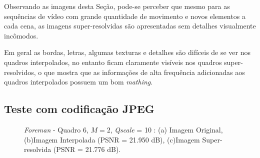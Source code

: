 Observando as imagens desta Seção, pode-se perceber que mesmo para as sequências de vídeo com grande quantidade de movimento e novos elementos a cada cena, as imagens super-resolvidas são apresentadas sem detalhes visualmente incômodos. 

Em geral as bordas, letras, algumas texturas e detalhes são difíceis de se ver nos quadros interpolados, no entanto ficam claramente visíveis nos quadros super-resolvidos, o que mostra que as informações de alta frequência adicionadas aos quadros interpolados possuem um bom \textit{mathing}. 
\clearpage
\subsection{Teste com codificação JPEG}
\begin{figure}[H]
    \centering
    \qquad
	\qquad

    \caption{\textit{Foreman} - Quadro 6, $M = 2$, \textit{Qscale} = 10 : (a) Imagem Original, (b)Imagem Interpolada (PSNR = 21.950 dB), (c)Imagem Super-resolvida (PSNR = 21.776 dB).}
	    
    \label{fig:1}
\end{figure}

